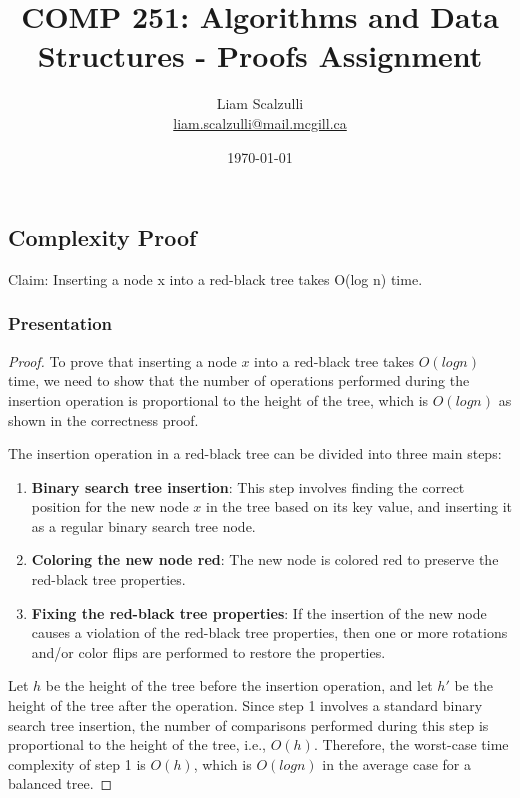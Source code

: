 \documentclass[10pt]{article}
\title{COMP 251: Algorithms and Data Structures - Proofs Assignment}
\author{Liam Scalzulli\\
\href{mailto:liam.scalzulli@mail.mcgill.ca}{liam.scalzulli@mail.mcgill.ca}}
\date{\today}
\begin{document}
\maketitle

\subsection*{Complexity Proof}

Claim: Inserting a node x into a red-black tree takes O(log n) time.

\subsubsection*{Presentation}

\begin{proof}
  To prove that inserting a node $x$ into a red-black tree takes $O(log n)$ time, we
  need to show that the number of operations performed during the insertion operation
  is proportional to the height of the tree, which is $O(logn)$ as shown in the
  correctness proof.

  \spacing
  \noindent
  The insertion operation in a red-black tree can be divided into three main steps:

  \begin{enumerate}
    \item \textbf{Binary search tree insertion}: This step involves finding the correct
      position for the new node $x$ in the tree based on its key value, and inserting
      it as a regular binary search tree node.
    \item \textbf{Coloring the new node red}: The new node is colored red to preserve the
      red-black tree properties.
    \item \textbf{Fixing the red-black tree properties}: If the insertion of the
      new node causes a violation of the red-black tree properties, then one
      or more rotations and/or color flips are performed to restore the properties.
  \end{enumerate}

  \noindent
  Let $h$ be the height of the tree before the insertion operation, and let $h'$
  be the height of the tree after the operation. Since step 1 involves a
  standard binary search tree insertion, the number of comparisons performed
  during this step is proportional to the height of the tree, i.e., $O(h)$.
  Therefore, the worst-case time complexity of step 1 is $O(h)$, which is
  $O(logn)$ in the average case for a balanced tree.


\end{proof}
\end{document}
